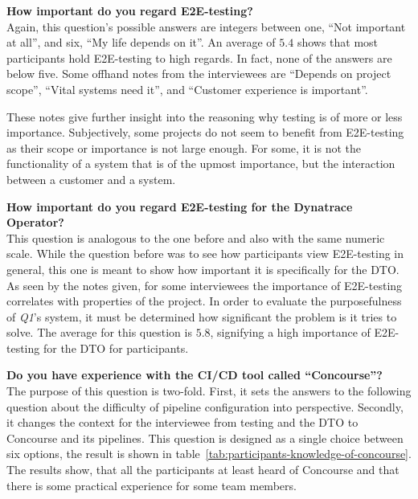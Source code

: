 \textbf{How important do you regard E2E-testing?}\\
Again, this question's possible answers are integers between one, ``Not important at all'', and six, ``My life depends on it''.
An average of $5.4$ shows that most participants hold E2E-testing to high regards.
In fact, none of the answers are below five.
Some offhand notes from the interviewees are ``Depends on project scope'', ``Vital systems need it'', and ``Customer experience is important''.

These notes give further insight into the reasoning why testing is of more or less importance.
Subjectively, some projects do not seem to benefit from E2E-testing as their scope or importance is not large enough.
For some, it is not the functionality of a system that is of the upmost importance, but the interaction between a customer and a system.

\pagebreak

\textbf{How important do you regard E2E-testing for the Dynatrace Operator?}\\
This question is analogous to the one before and also with the same numeric scale.
While the question before was to see how participants view E2E-testing in general, this one is meant to show how important it is specifically for the DTO.
As seen by the notes given, for some interviewees the importance of E2E-testing correlates with properties of the project.
In order to evaluate the purposefulness of \textit{Q1}'s system, it must be determined how significant the problem is it tries to solve.
The average for this question is $5.8$, signifying a high importance of E2E-testing for the DTO for participants.

\textbf{Do you have experience with the CI/CD tool called ``Concourse''?}\\
The purpose of this question is two-fold.
First, it sets the answers to the following question about the difficulty of pipeline configuration into perspective.
Secondly, it changes the context for the interviewee from testing and the DTO to Concourse and its pipelines.
This question is designed as a single choice between six options, the result is shown in table\ \ref{tab:participants-knowledge-of-concourse}.
The results show, that all the participants at least heard of Concourse and that there is some practical experience for some team members.

